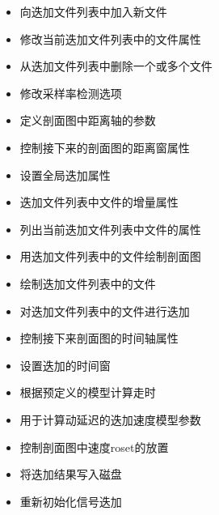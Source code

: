 \begin{itemize}
\item {} 向迭加文件列表中加入新文件
\item {} 修改当前迭加文件列表中的文件属性
\item {} 从迭加文件列表中删除一个或多个文件
\item {} 修改采样率检测选项
\item {} 定义剖面图中距离轴的参数
\item {} 控制接下来的剖面图的距离窗属性
\item {} 设置全局迭加属性
\item {} 迭加文件列表中文件的增量属性
\item {} 列出当前迭加文件列表中文件的属性
\item {} 用迭加文件列表中的文件绘制剖面图
\item {} 绘制迭加文件列表中的文件
\item {} 对迭加文件列表中的文件进行迭加
\item {} 控制接下来剖面图的时间轴属性
\item {} 设置迭加的时间窗
\item {} 根据预定义的模型计算走时
\item {} 用于计算动延迟的迭加速度模型参数
\item {} 控制剖面图中速度roset的放置
\item {} 将迭加结果写入磁盘
\item {} 重新初始化信号迭加
\end{itemize}
